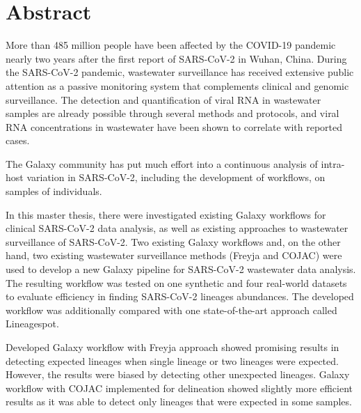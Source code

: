 %
\section*{Abstract}

More than 485 million people have been affected by the COVID-19 pandemic nearly two years after the first report of SARS-CoV-2 in Wuhan, China. During the SARS-CoV-2 pandemic, wastewater surveillance has received extensive public attention as a passive monitoring system that complements clinical and genomic surveillance. The detection and quantification of viral RNA in wastewater samples are already possible through several methods and protocols, and viral RNA concentrations in wastewater have been shown to correlate with reported cases.
    
The Galaxy community has put much effort into a continuous analysis of intra-host variation in SARS-CoV-2, including the development of workflows, on samples of individuals.
    
In this master thesis, there were investigated existing Galaxy workflows for clinical SARS-CoV-2 data analysis, as well as existing approaches to wastewater surveillance of SARS-CoV-2. Two existing Galaxy workflows and, on the other hand, two existing wastewater surveillance methods (Freyja and COJAC) were used to develop a new Galaxy pipeline for SARS-CoV-2 wastewater data analysis. The resulting workflow was tested on one synthetic and four real-world datasets to evaluate efficiency in finding SARS-CoV-2 lineages abundances. The developed workflow was additionally compared with one state-of-the-art approach called Lineagespot.

Developed Galaxy workflow with Freyja approach showed promising results in detecting expected lineages when single lineage or two lineages were expected. However, the results were biased by detecting other unexpected lineages. Galaxy workflow with COJAC implemented for delineation showed slightly more efficient results as it was able to detect only lineages that were expected in some samples.


